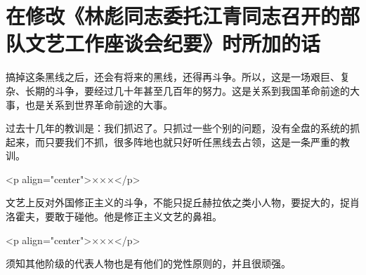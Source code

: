 \section[在修改《林彪同志委托江青同志召开的部队文艺工作座谈会纪要》时所加的话（一九六六年三月）]{在修改《林彪同志委托江青同志召开的部队文艺工作座谈会纪要》时所加的话}


搞掉这条黑线之后，还会有将来的黑线，还得再斗争。所以，这是一场艰巨、复杂、长期的斗争，要经过几十年甚至几百年的努力。这是关系到我国革命前途的大事，也是关系到世界革命前途的大事。

过去十几年的教训是：我们抓迟了。只抓过一些个别的问题，没有全盘的系统的抓起来，而只要我们不抓，很多阵地也就只好听任黑线去占领，这是一条严重的教训。

<p align="center">×××</p>

文艺上反对外国修正主义的斗争，不能只捉丘赫拉依之类小人物，要捉大的，捉肖洛霍夫，要敢于碰他。他是修正主义文艺的鼻祖。

<p align="center">×××</p>

须知其他阶级的代表人物也是有他们的党性原则的，并且很顽强。


